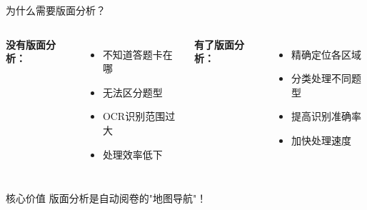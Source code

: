 \begin{frame}{为什么需要版面分析？}
    \begin{columns}
        \textbf{没有版面分析：}
        \begin{itemize}
            \item 不知道答题卡在哪
            \item 无法区分题型
            \item OCR识别范围过大
            \item 处理效率低下
        \end{itemize}

        \textbf{有了版面分析：}
        \begin{itemize}
            \item 精确定位各区域
            \item 分类处理不同题型
            \item 提高识别准确率
            \item 加快处理速度
        \end{itemize}
    \end{columns}

    \vspace{0.5cm}

    \begin{alertblock}{核心价值}
        版面分析是自动阅卷的"地图导航"！
    \end{alertblock}
\end{frame}

